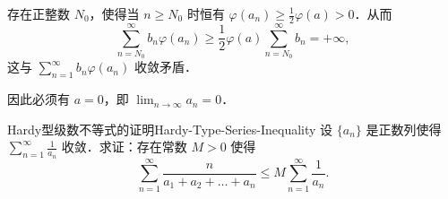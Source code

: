 \begin{myproof}
    存在正整数 $N_0$，使得当 $n \geqslant N_0$ 时恒有 $\varphi(a_n) \geqslant \frac{1}{2}\varphi(a) > 0$．从而
    \begin{equation}
        \sum_{n=N_0}^\infty b_n\varphi(a_n) \geqslant \frac{1}{2}\varphi(a) \sum_{n=N_0}^\infty b_n = +\infty,
    \end{equation}
    这与 $\sum_{n=1}^\infty b_n\varphi(a_n)$ 收敛矛盾．

    因此必须有 $a = 0$，即 $\lim_{n\to\infty} a_n = 0$．
\end{myproof}

\begin{problem}{Hardy型级数不等式的证明}{Hardy-Type-Series-Inequality}
    设 $\{a_n\}$ 是正数列使得 $\sum_{n=1}^\infty \frac{1}{a_n}$ 收敛．求证：存在常数 $M > 0$ 使得
    \begin{equation}
        \sum_{n=1}^\infty \frac{n}{a_1 + a_2 + \dots + a_n} \leqslant M \sum_{n=1}^\infty \frac{1}{a_n}.
    \end{equation}
\end{problem}


